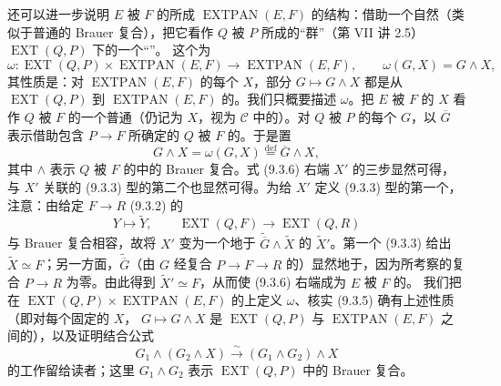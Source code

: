 还可以进一步说明 $E$ 被 $F$ 的所成 $\operatorname{EXTPAN}(E,F)$ 的结构：借助一个自然（类似于普通的 Brauer 复合），把它看作 $Q$ 被 $P$ 所成的“群”（第 VII 讲 2.5）$\operatorname{EXT}(Q,P)$ 下的一个“”。
这个为
\begin{equation}\tag{9.3.5}
 \omega:\operatorname{EXT}(Q,P)\times\operatorname{EXTPAN}(E,F)
 \longrightarrow\operatorname{EXTPAN}(E,F),\qquad \omega(G,X)=G\wedge X,
\end{equation}
其性质是：对 $\operatorname{EXTPAN}(E,F)$ 的每个 $X$，部分 $G\mapsto G\wedge X$ 都是从 $\operatorname{EXT}(Q,P)$ 到 $\operatorname{EXTPAN}(E,F)$ 的。我们只概要描述 $\omega$。把 $E$ 被 $F$ 的 $X$ 看作 $Q$ 被 $F$ 的一个普通（仍记为 $X$，视为 $\mathcal C$ 中的）。对 $Q$ 被 $P$ 的每个 $G$，以 $\overline G$ 表示借助包含 $P\to F$ 所确定的 $Q$ 被 $F$ 的。于是置
\begin{equation}\tag{9.3.6}
 G\wedge X=\omega(G,X)\overset{\mathrm{def}}=\overline G\wedge X,
\end{equation}
其中 $\wedge$ 表示 $Q$ 被 $F$ 的中的 Brauer 复合。式 (9.3.6) 右端 $X'$ 的三步显然可得，与 $X'$ 关联的 (9.3.3) 型的第二个也显然可得。为给 $X'$ 定义 (9.3.3) 型的第一个，注意：由给定 $F\to R$ (9.3.2) 的
\[
 Y\longmapsto\widetilde Y,\qquad
 \operatorname{EXT}(Q,F)\longrightarrow\operatorname{EXT}(Q,R)
\]
与 Brauer 复合相容，故将 $X'$ 变为一个地于 $\widetilde{\overline G}\wedge\widetilde X$ 的 $\widetilde X'$。第一个 (9.3.3) 给出 $\widetilde X\simeq F$；另一方面，$\widetilde{\overline G}$（由 $G$ 经复合 $P\to F\to R$ 的）显然地于，因为所考察的复合 $P\to R$ 为零。由此得到 $\widetilde X'\simeq F$，从而使 (9.3.6) 右端成为 $E$ 被 $F$ 的。
我们把在 $\operatorname{EXT}(Q,P)\times\operatorname{EXTPAN}(E,F)$ 的上定义 $\omega$、核实 (9.3.5) 确有上述性质（即对每个固定的 $X$， $G\mapsto G\wedge X$ 是 $\operatorname{EXT}(Q,P)$ 与 $\operatorname{EXTPAN}(E,F)$ 之间的），以及证明结合公式
\begin{equation}\tag{9.3.7}
 G_1\wedge(G_2\wedge X)\xrightarrow{\sim}(G_1\wedge G_2)\wedge X
\end{equation}
的工作留给读者；这里 $G_1\wedge G_2$ 表示 $\operatorname{EXT}(Q,P)$ 中的 Brauer 复合。

